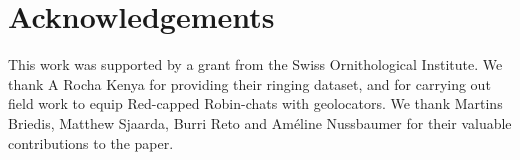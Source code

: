 \documentclass[]{interact}
\theoremstyle{plain}%
\theoremstyle{definition}
\theoremstyle{remark}
\begin{document}
\hypertarget{acknowledgements}{%
\section*{Acknowledgements}\label{acknowledgements}}

This work was supported by a grant from the Swiss Ornithological
Institute. We thank A Rocha Kenya for providing their ringing dataset,
and for carrying out field work to equip Red-capped Robin-chats with
geolocators. We thank Martins Briedis, Matthew Sjaarda, Burri Reto and
Améline Nussbaumer for their valuable contributions to the paper.



\end{document}
